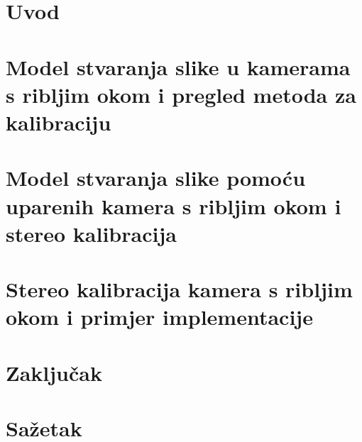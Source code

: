 \documentclass{ferseminar}
\begin{document}
\stvoripredstranice
\section{Uvod}



\section{Model stvaranja slike u kamerama s ribljim okom i pregled metoda za kalibraciju}



\section{Model stvaranja slike pomoću uparenih kamera s ribljim okom i stereo kalibracija}



\section{Stereo kalibracija kamera s ribljim okom i primjer implementacije}



\section{Zaključak}



\section{Sažetak}


\end{document}
